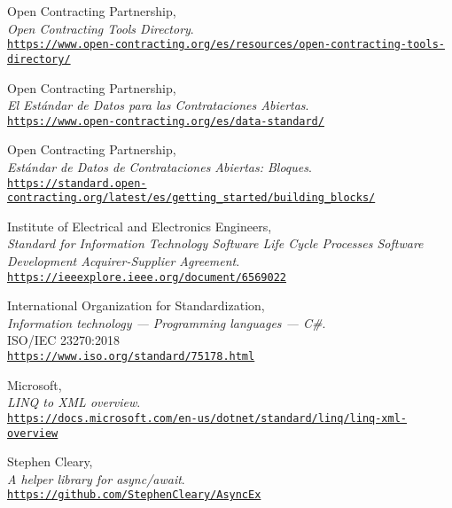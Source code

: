 \begin{thebibliography}{X}
            Open Contracting Partnership,
            \\ \textit{Open Contracting Tools Directory}.
            \\ \texttt{\url{https://www.open-contracting.org/es/resources/open-contracting-tools-directory/}}
            
            Open Contracting Partnership,
            \\ \textit{El Estándar de Datos para las Contrataciones Abiertas}.
            \\ \texttt{\url{https://www.open-contracting.org/es/data-standard/}}
            
            Open Contracting Partnership,
            \\ \textit{Estándar de Datos de Contrataciones Abiertas: Bloques}.
            \\ \texttt{\url{https://standard.open-contracting.org/latest/es/getting_started/building_blocks/}}
    
            Institute of Electrical and Electronics Engineers,
            \\ \textit{Standard for Information Technology Software Life Cycle Processes Software Development Acquirer-Supplier Agreement}.
            \\ \texttt{\url{https://ieeexplore.ieee.org/document/6569022}}
    
            International Organization for Standardization,
            \\ \textit{Information technology — Programming languages — C\#}.\\
            ISO/IEC 23270:2018
            \\ \texttt{\url{https://www.iso.org/standard/75178.html}}
        
            Microsoft,
            \\ \textit{LINQ to XML overview}.
            \\ \texttt{\url{https://docs.microsoft.com/en-us/dotnet/standard/linq/linq-xml-overview}}
        
            Stephen Cleary,
            \\ \textit{A helper library for async/await}.
            \\ \texttt{\url{https://github.com/StephenCleary/AsyncEx}}
        

\end{thebibliography}
